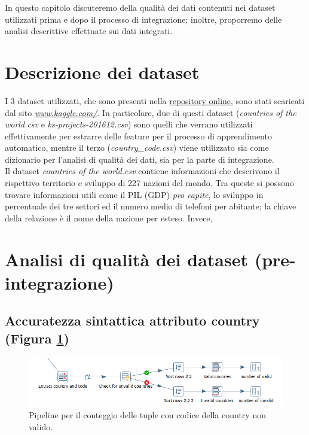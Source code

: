 In questo capitolo discuteremo della qualità dei dati contenuti nei dataset utilizzati prima e dopo il processo di integrazione; inoltre, proporremo delle analisi descrittive effettuate sui dati integrati. 
\section{Descrizione dei dataset}
I 3 dataset utilizzati, che sono presenti nella \href{https://gitlab.com/Daniele-Papetti/kickstarterprediction}{repository online}, sono stati scaricati dal sito \href{https://www.kaggle.com/}{\emph{www.kaggle.com/}}.
In particolare, due di questi dataset (\textit{countries of the world.csv} e \textit{ks-projects-201612.csv}) sono quelli che verrano utilizzati effettivamente per estrarre delle feature per il processo di apprendimento automatico, mentre il terzo (\textit{country\_code.csv}) viene utilizzato sia come dizionario per l'analisi di qualità dei dati, sia per la parte di integrazione.\\
Il dataset \textit{countries of the world.csv} contiene informazioni che descrivono il rispettivo territorio e sviluppo di 227 nazioni del mondo.
Tra queste si possono trovare informazioni utili come il PIL (GDP) \textit{pro capite}, lo sviluppo in percentuale dei tre settori ed il numero medio di telefoni per abitante; la chiave della relazione è il nome della nazione per esteso.
Invece, 

\section{Analisi di qualità dei dataset (pre-integrazione)}

\subsection{Accuratezza sintattica attributo country (Figura \ref{fig:dqcountrycodeaccuracy})}

\begin{figure}[h!]
	\centering
	\includegraphics[width=0.7\linewidth]{images/DQ_countrycodeaccuracy}
	\caption{Pipeline per il conteggio delle tuple con codice della country non valido.}
	\label{fig:dqcountrycodeaccuracy}
\end{figure}

